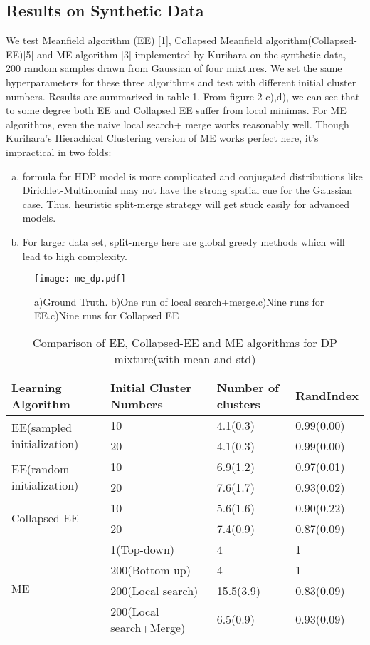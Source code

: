 \documentclass{article}
\begin{document}
\subsection{Results on Synthetic Data}
We test Meanfield algorithm (EE) [1], Collapsed Meanfield algorithm(Collapsed-EE)[5] and ME algorithm [3] implemented by Kurihara on the synthetic data, 200 random samples drawn from Gaussian of four mixtures.
We set the same hyperparameters for these three algorithms and test with different initial cluster numbers.
Results are summarized in table 1. 
From figure 2 c),d), we can see that to some degree both EE and Collapsed EE suffer from local minimas.
For ME algorithms, even the naive local search+ merge works reasonably well.
Though Kurihara's Hierachical Clustering version of ME works perfect here, it's impractical in two folds:
\begin{enumerate}[(a)]
\item formula for HDP model is more complicated and conjugated distributions like Dirichlet-Multinomial may not have the strong spatial cue for the Gaussian case.
Thus, heuristic split-merge strategy will get stuck easily for advanced models.
\item For larger data set, split-merge here are global greedy methods which will lead to high complexity.
\end{enumerate}
\begin{figure}[h] 
    \centering 
    \texttt{[image: me\_dp.pdf]} 
    \caption{a)Ground Truth. b)One run of local search+merge.c)Nine runs for EE.c)Nine runs for Collapsed EE} 
    \label{fig:by:table} 
\end{figure}
\begin{table}[t]
\caption{Comparison of EE, Collapsed-EE and ME algorithms for DP mixture(with mean and std)}
\begin{center}
\begin{tabular}{|l|l|l|l|}
\hline
{\bf Learning Algorithm} &{\bf Initial Cluster Numbers} &{\bf Number of clusters}  &{\bf RandIndex} \\ 
\hline 
\multirow{2}{*}{EE(sampled initialization)} & 10 & 4.1(0.3) & 0.99(0.00) \\
					    & 20 & 4.1(0.3) & 0.99(0.00)\\
\hline
\multirow{2}{*}{EE(random initialization)}  & 10 & 6.9(1.2)&  0.97(0.01) \\
					    & 20 & 7.6(1.7)&  0.93(0.02) \\
\hline
\multirow{2}{*}{Collapsed EE}               & 10 & 5.6(1.6)&  0.90(0.22) \\
					    & 20 & 7.4(0.9)&  0.87(0.09) \\
\hline
\multirow{4}{*}{ME}                         & 1(Top-down) &    4  &  1 \\
					    & 200(Bottom-up) & 4  &  1 \\
					    & 200(Local search) & 15.5(3.9)&  0.83(0.09) \\
					    & 200(Local search+Merge) & 6.5(0.9)&  0.93(0.09) \\
\hline
\end{tabular}
\end{center}
\end{table}
\end{document}
